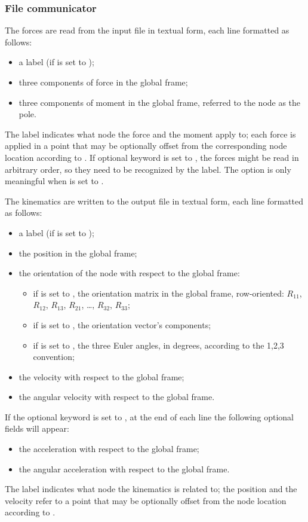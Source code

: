 \subsubsection{File communicator}
The forces are read from the input file in textual form,
each line formatted as follows:
\begin{itemize}
\item a label (if  is set to );
\item three components of force in the global frame;
\item three components of moment in the global frame,
	referred to the node as the pole.
\end{itemize}
The label indicates what node the force and the moment apply to; 
each force is applied in a point that may be optionally offset 
from the corresponding node location according to .
If optional keyword  is set to , the forces might be
read in arbitrary order, so they need to be recognized by the label.
The option  is only meaningful when  is set to .

The kinematics are written to the output file in textual form,
each line formatted as follows:
\begin{itemize}
\item a label (if  is set to );
\item the position in the global frame;
\item the orientation of the node with respect to the global frame:
\begin{itemize}
	\item if  is set to ,
	the orientation matrix in the global frame, row-oriented:
	$R_{11}$, $R_{12}$, $R_{13}$, $R_{21}$, \ldots, $R_{32}$, $R_{33}$;
	\item if  is set to ,
	the orientation vector's components;
	\item if  is set to ,
	the three Euler angles, in degrees, according to the 1,2,3
	convention;
\end{itemize}
\item the velocity with respect to the global frame;
\item the angular velocity with respect to the global frame.
\end{itemize}
If the optional keyword  is set to ,
at the end of each line the following optional fields will appear:
\begin{itemize}
\item the acceleration with respect to the global frame;
\item the angular acceleration with respect to the global frame.
\end{itemize}
The label indicates what node the kinematics is related to;
the position and the velocity refer to a point that may be optionally
offset from the node location according to .

